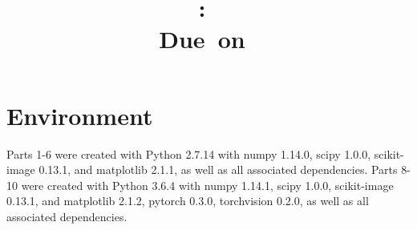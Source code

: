 \documentclass{article}
\title{
	\vspace{2in}
	\textmd{\textbf{\hmwkClass:\ \hmwkTitle}}\\
	\normalsize\vspace{0.1in}\small{Due\ on\ \hmwkDueDate}\\
	\vspace{0.1in}
	\vspace{3in}
}
\author{\textbf{\hmwkAuthorName}}
\newcommand{\enterproblemHeader}[1]{
}
\newcommand{\exitproblemHeader}[1]{
}
\newcounter{problem} %
\newcommand{\problemName}{}
\newenvironment{problem}[1][Part \theproblem]{ %
	\stepcounter{problem} %
	\renewcommand{\problemName}{#1} %
	\section{\problemName} %
	\enterproblemHeader{\problemName} %
}{
	\exitproblemHeader{\problemName} %
}
\begin{document}
\maketitle
\clearpage


\begin{problem}[Environment]	
	Parts 1-6 were created with Python 2.7.14 with numpy 1.14.0, scipy 1.0.0, scikit-image 0.13.1, and matplotlib 2.1.1, as well as all associated dependencies. Parts 8-10 were created with Python 3.6.4 with numpy 1.14.1, scipy 1.0.0, scikit-image 0.13.1, and matplotlib 2.1.2, pytorch 0.3.0, torchvision 0.2.0, as well as all associated dependencies.
\end{problem}
\clearpage
\end{document}
